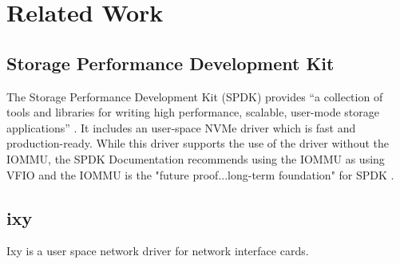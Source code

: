\chapter{Related Work}

\section{Storage Performance Development Kit}
The Storage Performance Development Kit (SPDK) provides ``a collection of tools and libraries for writing high performance, scalable, user-mode storage applications'' \cite{spdkindex}. It includes an user-space NVMe driver which is fast and production-ready. While this driver supports the use of the driver without the IOMMU, the SPDK Documentation recommends using the IOMMU as using VFIO and the IOMMU is the "future proof...long-term foundation" for SPDK \cite{spdkmemory}.

\section{ixy}
Ixy is a user space network driver for network interface cards.